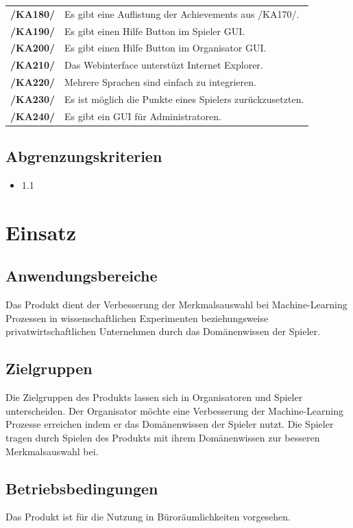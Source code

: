 \documentclass[a4paper]{scrreprt}
\begin{document}
\begin{tabularx}{\linewidth}{@{}>{\bfseries}l@{\hspace{.5em}}X@{}}
/KA180/ & Es gibt eine Auflistung der \Gls{Achievement}s aus /KA170/. \\
/KA190/ & Es gibt einen Hilfe Button im \Gls{Spieler} GUI. \\ %
/KA200/ & Es gibt einen Hilfe Button im \Gls{Organisator} GUI. \\ %
/KA210/ & Das Webinterface unterstüzt Internet Explorer. \\
/KA220/ & Mehrere Sprachen sind einfach zu integrieren. \\ 
/KA230/ & Es ist möglich die Punkte eines \Gls{Spieler}s zurückzusetzten. \\ %
/KA240/ & Es gibt ein GUI für \Gls{Administrator}en. \\ %
\end{tabularx}

\section{Abgrenzungskriterien}
\begin{itemize} 
  \item 1.1
\end{itemize} 
 
\chapter{Einsatz}

\section{Anwendungsbereiche}
Das \Gls{Produkt} dient der Verbesserung der Merkmalsauswahl bei Machine-Learning Prozessen in wissenschaftlichen
Experimenten beziehungsweise privatwirtschaftlichen Unternehmen durch das Domänenwissen der \Gls{Spieler}.

\section{Zielgruppen}
Die Zielgruppen des \Gls{Produkt}s lassen sich in \Gls{Organisator}en und \Gls{Spieler} unterscheiden.
Der Organisator möchte eine Verbesserung der Machine-Learning Prozesse erreichen indem er das Domänenwissen der Spieler nutzt.
Die Spieler tragen durch Spielen des \Gls{Produkt}s mit ihrem Domänenwissen zur besseren Merkmalsauswahl bei.

\section{Betriebsbedingungen}
Das \Gls{Produkt} ist für die Nutzung in Büroräumlichkeiten vorgesehen.
\end{document}
